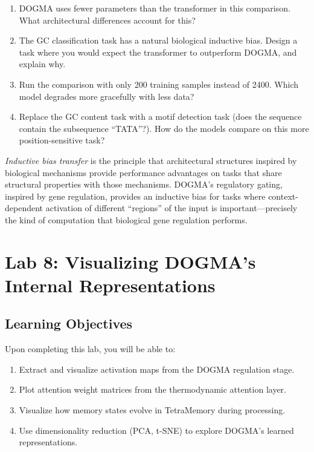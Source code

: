 \begin{enumerate}[leftmargin=1.8em]
  \item DOGMA uses fewer parameters than the transformer in this comparison. What architectural differences account for this?
  \item The GC classification task has a natural biological inductive bias. Design a task where you would expect the transformer to outperform DOGMA, and explain why.
  \item Run the comparison with only 200 training samples instead of 2400. Which model degrades more gracefully with less data?
  \item Replace the GC content task with a motif detection task (does the sequence contain the subsequence ``TATA''?). How do the models compare on this more position-sensitive task?
\end{enumerate}

\begin{dogmadef}
\emph{Inductive bias transfer} is the principle that architectural structures inspired by biological mechanisms provide performance advantages on tasks that share structural properties with those mechanisms. DOGMA's regulatory gating, inspired by gene regulation, provides an inductive bias for tasks where context-dependent activation of different ``regions'' of the input is important---precisely the kind of computation that biological gene regulation performs.
\end{dogmadef}


\section{Lab 8: Visualizing DOGMA's Internal Representations}
\label{sec:lab8-visualization}

\subsection{Learning Objectives}

Upon completing this lab, you will be able to:
\begin{enumerate}[leftmargin=1.8em]
  \item Extract and visualize activation maps from the DOGMA regulation stage.
  \item Plot attention weight matrices from the thermodynamic attention layer.
  \item Visualize how memory states evolve in TetraMemory during processing.
  \item Use dimensionality reduction (PCA, t-SNE) to explore DOGMA's learned representations.
\end{enumerate}


